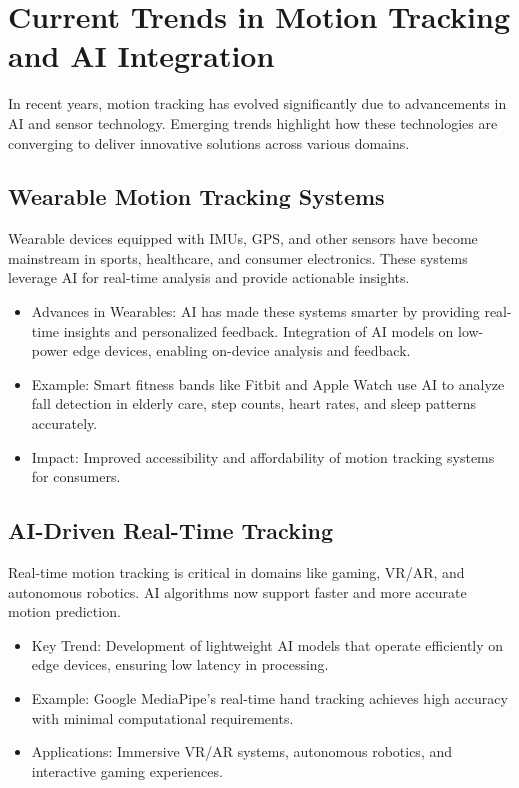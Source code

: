 \section{Current Trends in Motion Tracking and AI Integration}
In recent years, motion tracking has evolved significantly due to advancements in AI and sensor technology. Emerging trends highlight how these technologies are converging to deliver innovative solutions across various domains.

\subsection{Wearable Motion Tracking Systems}
Wearable devices equipped with IMUs, GPS, and other sensors have become mainstream in sports, healthcare, and consumer electronics. These systems leverage AI for real-time analysis and provide actionable insights.

\begin{itemize}
    \item Advances in Wearables: AI has made these systems smarter by providing real-time insights and personalized feedback. Integration of AI models on low-power edge devices, enabling on-device analysis and feedback.
    \item Example: Smart fitness bands like Fitbit and Apple Watch use AI to analyze fall detection in elderly care, step counts, heart rates, and sleep patterns accurately.
    \item Impact: Improved accessibility and affordability of motion tracking systems for consumers.
\end{itemize}

\subsection{AI-Driven Real-Time Tracking}
Real-time motion tracking is critical in domains like gaming, VR/AR, and autonomous robotics. AI algorithms now support faster and more accurate motion prediction.

\begin{itemize}
    \item Key Trend: Development of lightweight AI models that operate efficiently on edge devices, ensuring low latency in processing.
    \item Example: Google MediaPipe’s real-time hand tracking achieves high accuracy with minimal computational requirements.
    \item Applications: Immersive VR/AR systems, autonomous robotics, and interactive gaming experiences.
\end{itemize}
    
